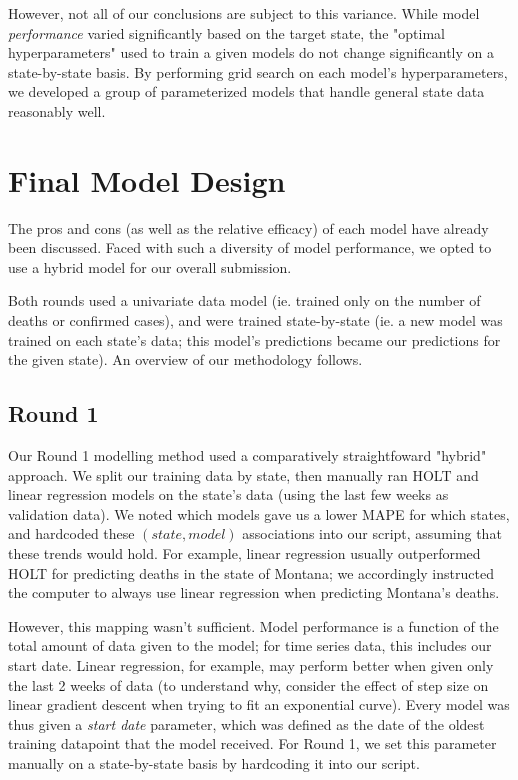 \documentclass[sigconf,nonacm]{acmart}
\begin{document}
However, not all of our conclusions are subject to this variance. While model
\emph{performance} varied significantly based on the target state, the "optimal
hyperparameters" used to train a given models do not change significantly on a
state-by-state basis. By performing grid search on each model's
hyperparameters, we developed a group of parameterized models that handle
general state data reasonably well. 



\section{Final Model Design}

The pros and cons (as well as the relative efficacy) of each model have already
been discussed. Faced with such a diversity of model performance, we opted to
use a hybrid model for our overall submission. 

Both rounds used a univariate data model (ie. trained only on the number of
deaths or confirmed cases), and were trained state-by-state (ie. a new model
was trained on each state's data; this model's predictions became our
predictions for the given state). An overview of our methodology follows. 

\subsection{Round 1}

Our Round 1 modelling method used a comparatively straightfoward "hybrid"
approach. We split our training data by state, then manually ran HOLT and
linear regression models on the state's data (using the last few weeks as
validation data). We noted which models gave us a lower MAPE for which states,
and hardcoded these $(state, model)$ associations into our script, assuming
that these trends would hold. For example, linear regression usually
outperformed HOLT for predicting deaths in the state of Montana; we accordingly
instructed the computer to always use linear regression when predicting
Montana's deaths. 

However, this mapping wasn't sufficient. 
Model performance is a function of the total amount of data given to the model;
for time series data, this includes our start date. Linear regression, for
example, may perform better when given only the last 2 weeks of data (to
understand why, consider the effect of step size on linear gradient descent
when trying to fit an exponential curve). 
Every model was thus given a \emph{start date} parameter, which was defined as
the date of the oldest training datapoint that the model received. 
For Round 1, we set this parameter manually on a state-by-state basis by
hardcoding it into our script. 
\end{document}

